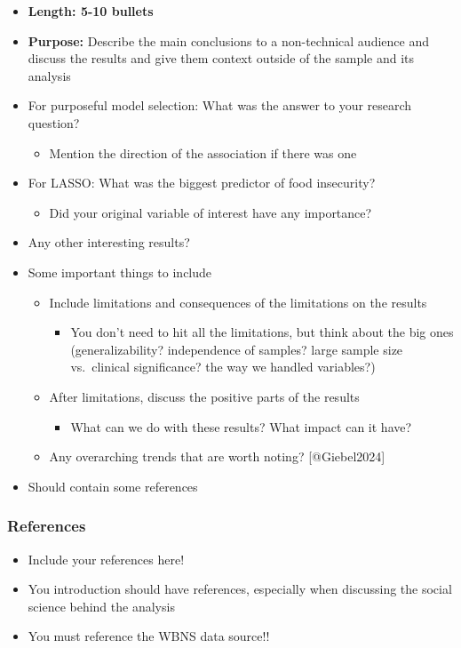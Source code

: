 \documentclass[
  letterpaper,
  DIV=11,
  numbers=noendperiod]{scrartcl}
\providecommand{\tightlist}{%
  \setlength{\itemsep}{0pt}\setlength{\parskip}{0pt}}\usepackage{longtable,booktabs,array}
\begin{document}
\begin{itemize}
\tightlist
\item
  \textbf{Length: 5-10 bullets}
\item
  \textbf{Purpose:} Describe the main conclusions to a non-technical
  audience and discuss the results and give them context outside of the
  sample and its analysis
\item
  {For purposeful model selection:} What was the answer to your research
  question?

  \begin{itemize}
  \tightlist
  \item
    Mention the direction of the association if there was one
  \end{itemize}
\item
  {For LASSO:} What was the biggest predictor of food insecurity?

  \begin{itemize}
  \tightlist
  \item
    Did your original variable of interest have any importance?
  \end{itemize}
\item
  Any other interesting results?
\item
  Some important things to include

  \begin{itemize}
  \tightlist
  \item
    Include limitations and consequences of the limitations on the
    results

    \begin{itemize}
    \tightlist
    \item
      You don't need to hit all the limitations, but think about the big
      ones (generalizability? independence of samples? large sample size
      vs.~clinical significance? the way we handled variables?)
    \end{itemize}
  \item
    After limitations, discuss the positive parts of the results

    \begin{itemize}
    \tightlist
    \item
      What can we do with these results? What impact can it have?
    \end{itemize}
  \item
    Any overarching trends that are worth noting? {[}@Giebel2024{]}
  \end{itemize}
\item
  Should contain some references
\end{itemize}

\subsubsection{References}\label{references}

\begin{itemize}
\tightlist
\item
  Include your references here!
\item
  You introduction should have references, especially when discussing
  the social science behind the analysis
\item
  You must reference the WBNS data source!!
\end{itemize}
\end{document}
